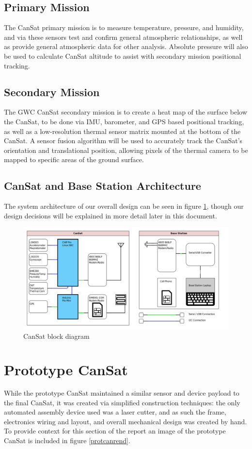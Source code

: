 \documentclass[]{report}
\begin{document}
		\subsection{Primary Mission}
		The CanSat primary mission is to measure temperature, pressure, and humidity, and via these sensors test and confirm general atmospheric relationships, as well as provide general atmospheric data for other analysis. Absolute pressure will also be used to calculate CanSat altitude to assist with secondary mission positional tracking.
		\subsection{Secondary Mission}
		The GWC CanSat secondary mission is to create a heat map of the surface below the CanSat, to be done via IMU, barometer, and GPS based positional tracking, as well as a low-resolution thermal sensor matrix mounted at the bottom of the CanSat. A sensor fusion algorithm will be used to accurately track the CanSat's orientation and translational position, allowing pixels of the thermal camera to be mapped to specific areas of the ground surface.
		\subsection{CanSat and Base Station Architecture}
		The system architecture of our overall design can be seen in figure \ref{bdiagram}, though our design decisions will be explained in more detail later in this document.
		
		\begin{figure}[h]
			\hfill\includegraphics[scale=0.4]{Block_Diagram.png}\hspace*{\fill}
			\caption{CanSat block diagram}
			\label{bdiagram}
		\end{figure}
		
		\section{Prototype CanSat}
		\label{sect:prot}
		While the prototype CanSat maintained a similar sensor and device payload to the final CanSat, it was created via simplified construction techniques: the only automated assembly device used was a laser cutter, and as such the frame, electronics wiring and layout, and overall mechanical design was created by hand. To provide context for this section of the report an image of the prototype CanSat is included in figure \ref{protcanrend}.
		
\end{document}
